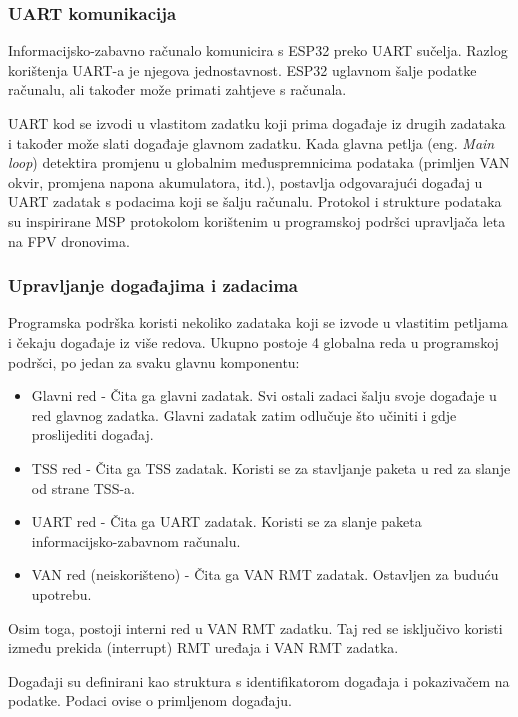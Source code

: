 \subsubsection{UART komunikacija}

Informacijsko-zabavno računalo komunicira s ESP32 preko UART sučelja. Razlog korištenja UART-a je njegova jednostavnost. 
ESP32 uglavnom šalje podatke računalu, ali također može primati zahtjeve s računala.

\noindent
UART kod se izvodi u vlastitom zadatku koji prima događaje iz drugih zadataka i također može slati događaje glavnom zadatku. 
Kada glavna petlja (eng. \textit{Main loop}) detektira promjenu u globalnim međuspremnicima podataka (primljen VAN okvir, promjena napona akumulatora, itd.), 
postavlja odgovarajući događaj u UART zadatak s podacima koji se šalju računalu. 
Protokol i strukture podataka su inspirirane MSP protokolom korištenim u programskoj podršci upravljača leta na FPV dronovima.

\subsubsection{Upravljanje događajima i zadacima}

Programska podrška koristi nekoliko zadataka koji se izvode u vlastitim petljama i čekaju događaje iz više redova. Ukupno postoje 4 globalna reda u programskoj podršci, po jedan za svaku glavnu komponentu:
\begin{itemize}
\item Glavni red - Čita ga glavni zadatak. Svi ostali zadaci šalju svoje događaje u red glavnog zadatka. Glavni zadatak zatim odlučuje što učiniti i gdje proslijediti događaj.
\item TSS red - Čita ga TSS zadatak. Koristi se za stavljanje paketa u red za slanje od strane TSS-a.
\item UART red - Čita ga UART zadatak. Koristi se za slanje paketa informacijsko-zabavnom računalu.
\item VAN red (neiskorišteno) - Čita ga VAN RMT zadatak. Ostavljen za buduću upotrebu.
\end{itemize}

\noindent
Osim toga, postoji interni red u VAN RMT zadatku. Taj red se isključivo koristi između prekida (interrupt) RMT uređaja i VAN RMT zadatka.

\bigskip
\noindent
Događaji su definirani kao struktura s identifikatorom događaja i pokazivačem na podatke. Podaci ovise o primljenom događaju.

